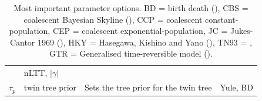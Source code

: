 \documentclass{article}
\begin{document}
\begin{table}
\begin{tabular}{|@{}c|p{2.5cm}|p{9cm}|p{4.5cm}@{}|}
      & nLTT, $|\gamma|$ \\
    $\mathit{\tau_{p}}$ & twin tree prior & Sets the tree prior for the twin 
tree 
      & Yule, BD \\
    \hline
  \end{tabular}
  \caption{
    Most important parameter options. 
    BD = birth death (\cite{nee1994reconstructed}), 
    CBS = coalescent Bayesian Skyline (\cite{drummond2005bayesian}), 
    CCP = coalescent constant-population, 
    CEP = coalescent exponential-population,
    JC = Jukes-Cantor 1969 (\cite{jukes1969evolution}), 
    HKY = Hasegawa, Kishino and  Yano (\cite{hasegawa1985dating}), 
    TN93 = \cite{tamura1993estimation}, 
    GTR = Generalised time-reversible model (\cite{tavare1986some}).
  }
  \label{tab:options}
\bigskip


\end{table}
\end{document}
